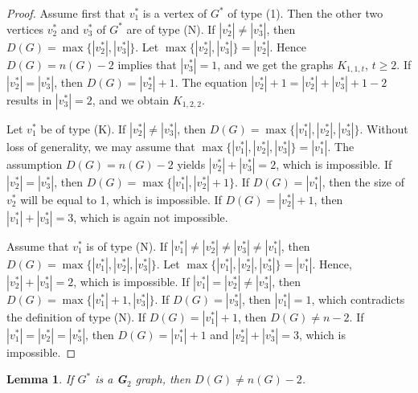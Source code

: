 \documentclass[12pt]{article}
\newtheorem{lemma}[theorem]{Lemma}
\begin{document}
\begin{proof} 
Assume first that  $v^{\ast}_1$ is a vertex of $G^{\ast}$ of type (1). Then the other two vertices $v^{\ast}_2$ and $v^{\ast}_3$ of $G^{\ast}$ are of type (N). If 
$|v^{\ast}_2|\neq |v^{\ast}_3|$, then $D(G)=\max \{|v^{\ast}_2|, |v^{\ast}_3|\}$. 
Let $\max \{|v^{\ast}_2|, |v^{\ast}_3|\}=|v^{\ast}_2|$. 
Hence $D(G)=n(G)-2$ implies that $|v^{\ast}_3|=1$, and we get the graphs $K_{1, 1, t}$, $t\geq 2$.  
If $|v^{\ast}_2|=|v^{\ast}_3|$, then $D(G)=|v^{\ast}_2|+1$. 
The equation $|v^{\ast}_2|+1=|v^{\ast}_2|+|v^{\ast}_3|+1-2$ 
results in $|v^{\ast}_3|=2$, and we obtain $K_{1, 2, 2}$. 

Let $v^{\ast}_1$ be of type (K). 
If $|v^{\ast}_2|\neq |v^{\ast}_3|$, then $D(G)=\max \{|v^{\ast}_1|, |v^{\ast}_2|, |v^{\ast}_3|\}$. Without loss of generality, we may assume that 
$\max \{|v^{\ast}_1|, |v^{\ast}_2|, |v^{\ast}_3|\}=|v^{\ast}_1|$. 
The assumption $D(G)=n(G)-2$ yields $|v^{\ast}_2|+|v^{\ast}_3|=2$, 
which is impossible. 
If $|v^{\ast}_2|= |v^{\ast}_3|$, 
then $D(G)=\max \{|v^{\ast}_1|, |v^{\ast}_2|+1\}$. 
If $D(G)=|v^{\ast}_1|$, then the size of $v^{\ast}_2$ will be equal to 1, which is impossible. 
If $D(G)=|v^{\ast}_2|+1$, then $|v^{\ast}_1| + |v^{\ast}_3|=3$, which is again not impossible.

Assume that $v^{\ast}_1$ is of type (N). 
If $|v^{\ast}_1|\neq |v^{\ast}_2|\neq |v^{\ast}_3| \neq |v^{\ast}_1|$, 
then $D(G)=\max \{|v^{\ast}_1|, |v^{\ast}_2|, |v^{\ast}_3|\}$. 
Let $\max \{|v^{\ast}_1|, |v^{\ast}_2|, |v^{\ast}_3|\}=|v^{\ast}_1|$. 
Hence, $|v^{\ast}_2|+|v^{\ast}_3|=2$, which is impossible.  
If $|v^{\ast}_1|=|v^{\ast}_2|\neq |v^{\ast}_3|$, then
$D(G)=\max \{|v^{\ast}_1|+1, |v^{\ast}_3|\}$. 
If $D(G)=|v^{\ast}_3|$, then $|v^{\ast}_1| =1$, 
which contradicts the definition of type (N).
If $D(G)=|v^{\ast}_1|+1$, then $D(G)\neq n-2$. If $|v^{\ast}_1|=|v^{\ast}_2|= |v^{\ast}_3|$,  then
$D(G)=|v^{\ast}_1|+1$ and $|v^{\ast}_2|+|v^{\ast}_3|=3$, which is impossible.
\end{proof}

\begin{lemma}\label{G2}
If $G^{\ast}$ is a {\bf G}$_2$ graph, then $D(G)\neq n(G)-2$.
\end{lemma}
\end{document}
